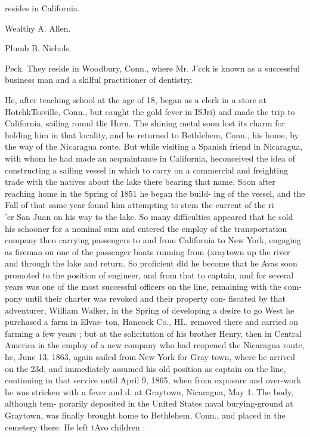 \documentclass[oneside]{book}
\begin{document}
resides in California. 


Wealthy A. Allen. 




Plumb B. Nichols. 


Peck. They reside in Woodbury, Conn., where Mr. J'cck is 
known as a successful business man and a skilful practitioner 
of dentistry. 





He, after teaching school at the age of 18, began as a clerk in 
a store at HotchkTssville, Conn., but caught the gold fever in 
ISJri) and made the trip to California, sailing round tlie Horn. 
The shining metal soon lost its charm for holding him in that 
locality, and he returned to Bethlehem, Conn., his home, by 
the way of the Nicaragua route. But while visiting a Spanish 
friend in Nicaragua, with whom he had made an acquaintance 
in California, heconceived the idea of constructing a sailing 
vessel in which to carry on a commercial and freighting trade 
with the natives about the lake there bearing that name. Soon 
after reaching home in the Spring of 1851 he began the build- 
ing of the vessel, and the Fall of that same year found him 
attempting to stem the current of the ri\\'er San Juan on his 
way to the lake. So many difficulties appeared that he sold 
his schooner for a nominal sum and entered the employ of the 
transportation company then carrying passengers to and from 
California to New York, engaging as fireman on one of the 
passenger boats running from (xraytown up the river and 
through the lake and return. So proficient did he become 
that he Avas soon promoted to the position of engineer, and 
from that to captain, and for several years was one of the 
most successful officers on the line, remaining with the com- 
pany until their charter was revoked and their property con- 
fiscated by that adventurer, William Walker, in the Spring of 
developing a desire to go West he purchased a farm in Elvas- 
ton, Hancock Co., HI., removed there and carried on farming 
a few years ; but at the solicitation of his brother Henry, then 
in Central America in the employ of a new company who had 
reopened the Nicaragua route, he, June 13, 1863, again sailed 
from New York for Gray town, where he arrived on the 23d, 
and immediately assumed his old position as captain on the 
line, continuing in that service until April 9, 1865, when from 
exposure and over-work he was stricken with a fever and d. 
at Graytown, Nicaragua, May 1. The body, although tem- 
porarily deposited in the United States naval burying-ground 
at Graytown, was finally brought home to Bethlehem, Conn., 
and placed in the cemetery there. He left tAvo children : 
\end{document}
